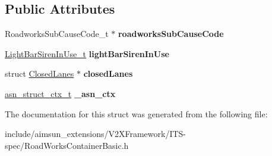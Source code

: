 \subsection*{Public Attributes}
\begin{DoxyCompactItemize}
\item 
Roadworks\+Sub\+Cause\+Code\+\_\+t $\ast$ {\bfseries roadworks\+Sub\+Cause\+Code}\hypertarget{structRoadWorksContainerBasic_ad5ec1d31df791d7ee116c13b3b3f82ef}{}\label{structRoadWorksContainerBasic_ad5ec1d31df791d7ee116c13b3b3f82ef}

\item 
\hyperlink{structBIT__STRING__s}{Light\+Bar\+Siren\+In\+Use\+\_\+t} {\bfseries light\+Bar\+Siren\+In\+Use}\hypertarget{structRoadWorksContainerBasic_ab35922d06dc3b29931a0d19a8f39b912}{}\label{structRoadWorksContainerBasic_ab35922d06dc3b29931a0d19a8f39b912}

\item 
struct \hyperlink{structClosedLanes}{Closed\+Lanes} $\ast$ {\bfseries closed\+Lanes}\hypertarget{structRoadWorksContainerBasic_a052a868de9cc274aa5d2fa067c0dcd22}{}\label{structRoadWorksContainerBasic_a052a868de9cc274aa5d2fa067c0dcd22}

\item 
\hyperlink{structasn__struct__ctx__s}{asn\+\_\+struct\+\_\+ctx\+\_\+t} {\bfseries \+\_\+asn\+\_\+ctx}\hypertarget{structRoadWorksContainerBasic_ae71784589db21e3a72ffbf8288e7cfff}{}\label{structRoadWorksContainerBasic_ae71784589db21e3a72ffbf8288e7cfff}

\end{DoxyCompactItemize}


The documentation for this struct was generated from the following file\+:\begin{DoxyCompactItemize}
\item 
include/aimsun\+\_\+extensions/\+V2\+X\+Framework/\+I\+T\+S-\/spec/Road\+Works\+Container\+Basic.\+h\end{DoxyCompactItemize}
